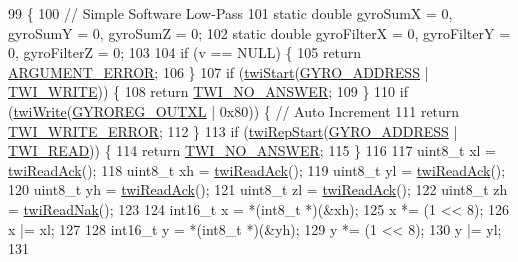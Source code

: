 \begin{DoxyCode}
99                             \{
100     \textcolor{comment}{// Simple Software Low-Pass}
101     \textcolor{keyword}{static} \textcolor{keywordtype}{double} gyroSumX = 0, gyroSumY = 0, gyroSumZ = 0;
102     \textcolor{keyword}{static} \textcolor{keywordtype}{double} gyroFilterX = 0, gyroFilterY = 0, gyroFilterZ = 0;
103 
104     \textcolor{keywordflow}{if} (v == NULL) \{
105         \textcolor{keywordflow}{return} \hyperlink{group__error_gga2c3e4bb40f36b262a5214e2da2bca9c5a49ccf277a69dd938c591928aa27c66cc}{ARGUMENT\_ERROR};
106     \}
107     \textcolor{keywordflow}{if} (\hyperlink{group__twi_ga4f86edc73f37ce976ea2225519ab31cd}{twiStart}(\hyperlink{group__config_ga8ed1f343e82440b4ef900e5fe42d74f0}{GYRO\_ADDRESS} | \hyperlink{group__twi_ga3b68e8e777b71520f9dbfac733774d5f}{TWI\_WRITE})) \{
108         \textcolor{keywordflow}{return} \hyperlink{group__error_gga2c3e4bb40f36b262a5214e2da2bca9c5a04d5943ba652af2205c88b247e0c659c}{TWI\_NO\_ANSWER};
109     \}
110     \textcolor{keywordflow}{if} (\hyperlink{group__twi_gaf42e50aaf4a9794d3a2c000e7b407887}{twiWrite}(\hyperlink{group__gyro_ga8840a0f1e53e6999ddf435a61c0dc279}{GYROREG\_OUTXL} | 0x80)) \{ \textcolor{comment}{// Auto Increment}
111         \textcolor{keywordflow}{return} \hyperlink{group__error_gga2c3e4bb40f36b262a5214e2da2bca9c5ac0e3b3463dcaf220e54794b4711708c9}{TWI\_WRITE\_ERROR};
112     \}
113     \textcolor{keywordflow}{if} (\hyperlink{group__twi_ga996e3cbbbb7239e2278bd286e61f0791}{twiRepStart}(\hyperlink{group__config_ga8ed1f343e82440b4ef900e5fe42d74f0}{GYRO\_ADDRESS} | \hyperlink{group__twi_gaaf9a8abccd811954f9cc316f2b2f87b3}{TWI\_READ})) \{
114         \textcolor{keywordflow}{return} \hyperlink{group__error_gga2c3e4bb40f36b262a5214e2da2bca9c5a04d5943ba652af2205c88b247e0c659c}{TWI\_NO\_ANSWER};
115     \}
116 
117     uint8\_t xl = \hyperlink{group__twi_ga0ab816bd0abcc24d6817f8395de7eafd}{twiReadAck}();
118     uint8\_t xh = \hyperlink{group__twi_ga0ab816bd0abcc24d6817f8395de7eafd}{twiReadAck}();
119     uint8\_t yl = \hyperlink{group__twi_ga0ab816bd0abcc24d6817f8395de7eafd}{twiReadAck}();
120     uint8\_t yh = \hyperlink{group__twi_ga0ab816bd0abcc24d6817f8395de7eafd}{twiReadAck}();
121     uint8\_t zl = \hyperlink{group__twi_ga0ab816bd0abcc24d6817f8395de7eafd}{twiReadAck}();
122     uint8\_t zh = \hyperlink{group__twi_ga5fad19b3784aeaa9ae995e64f9e965b8}{twiReadNak}();
123 
124     int16\_t x = *(int8\_t *)(&xh);
125     x *= (1 << 8);
126     x |= xl;
127 
128     int16\_t y = *(int8\_t *)(&yh);
129     y *= (1 << 8);
130     y |= yl;
131 

\end{DoxyCode}
